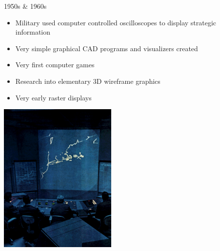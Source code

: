 \documentclass{lug}
\begin{document}
\begin{frame}{1950s \& 1960s}
    \noindent
    \begin{minipage}{.65\textwidth - 2em}
        \small
        \begin{itemize}
            \item Military used computer controlled oscilloscopes to display strategic information
            \item Very simple graphical CAD programs and visualizers created
            \item Very first computer games
            \item Research into elementary 3D wireframe graphics
            \item Very early raster displays
        \end{itemize}
    \end{minipage}%
    \hspace{1.5em}%
    \begin{minipage}{.35\textwidth}
        \includegraphics[width=\textwidth]{graphics/sage_control} \\

\end{minipage}
\end{frame}
\end{document}
